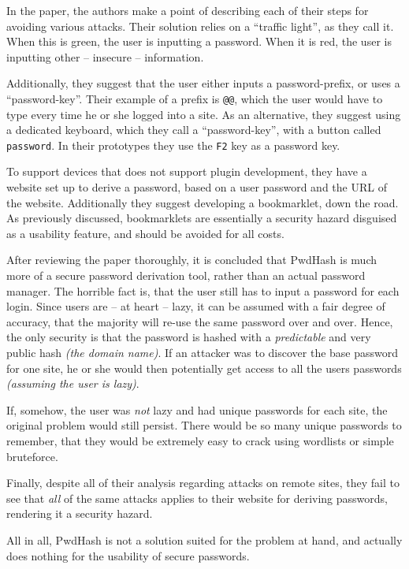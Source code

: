 			In the paper, the authors make a point of describing each of their steps for avoiding various attacks. Their solution relies on a ``traffic light'', as they call it. When this is green, the user is inputting a password. When it is red, the user is inputting other -- insecure -- information. 

			Additionally, they suggest that the user either inputs a password-prefix, or uses a ``password-key''. Their example of a prefix is \verb=@@=, which the user would have to type every time he or she logged into a site. As an alternative, they suggest using a dedicated keyboard, which they call a ``password-key'', with a button called \verb=password=. In their prototypes they use the \verb=F2= key as a password key.

			To support devices that does not support plugin development, they have a website set up to derive a password, based on a user password and the URL of the website. Additionally they suggest developing a bookmarklet, down the road. As previously discussed, bookmarklets are essentially a security hazard disguised as a usability feature, and should be avoided for all costs.


			After reviewing the paper thoroughly, it is concluded that PwdHash is much more of a secure password derivation tool, rather than an actual password manager. The horrible fact is, that the user still has to input a password for each login. Since users are -- at heart -- lazy, it can be assumed with a fair degree of accuracy, that the majority will re-use the same password over and over. Hence, the only security is that the password is hashed with a \emph{predictable} and very public hash \emph{(the domain name)}. If an attacker was to discover the base password for one site, he or she would then potentially get access to all the users passwords \emph{(assuming the user is lazy)}.

			If, somehow, the user was \emph{not} lazy and had unique passwords for each site, the original problem would still persist. There would be so many unique passwords to remember, that they would be extremely easy to crack using wordlists or simple bruteforce.

			Finally, despite all of their analysis regarding attacks on remote sites, they fail to see that \emph{all} of the same attacks applies to their website for deriving passwords, rendering it a security hazard.

			All in all, PwdHash is not a solution suited for the problem at hand, and actually does nothing for the usability of secure passwords.

